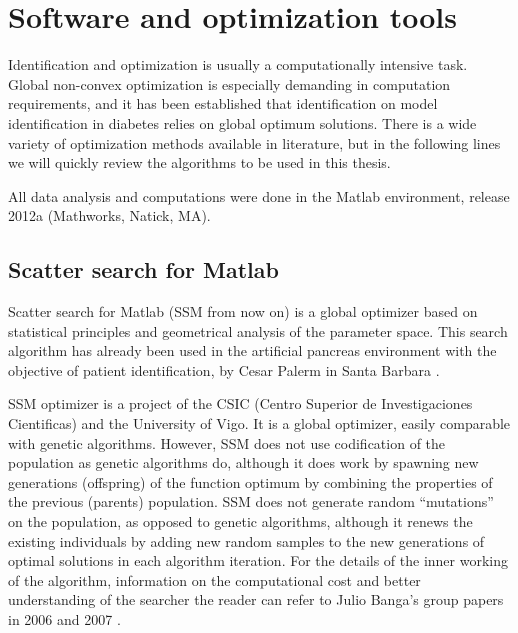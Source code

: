 \section{Software and optimization tools}
\label{sec:OptimizationAndSoftware}

Identification and optimization is usually a computationally intensive task. Global non-convex optimization is especially demanding in computation requirements, and it has been established that identification on model identification in diabetes relies on global optimum solutions. There is a wide variety of optimization methods available in literature, but in the following lines we will quickly review the algorithms to be used in this thesis.

All data analysis and computations were done in the Matlab environment, release 2012a (Mathworks, Natick, MA).

\subsection{Scatter search for Matlab}
\label{sec:ScatterSearchForMatlab}

Scatter search for Matlab (SSM from now on) is a global optimizer based on statistical principles and geometrical analysis of the parameter space. This search algorithm has already been used in the artificial pancreas environment with the objective of patient identification, by Cesar Palerm in Santa Barbara \cite{palerm2006robust}.

SSM optimizer is a project of the CSIC (Centro Superior de Investigaciones Cientificas) and the University of Vigo. It is a global optimizer, easily comparable with genetic algorithms. However, SSM does not use codification of the population as genetic algorithms do, although it does work by spawning new generations (offspring) of the function optimum by combining the properties of the previous (parents) population. SSM does not generate random ``mutations'' on the population, as opposed to genetic algorithms, although it renews the existing individuals by adding new random samples to the new generations of optimal solutions in each algorithm iteration. For the details of the inner working of the algorithm, information on the computational cost and better understanding of the searcher the reader can refer to Julio Banga's group papers in 2006 \cite{rodriguez2006novel} and 2007 \cite{egea2007scatter}.

